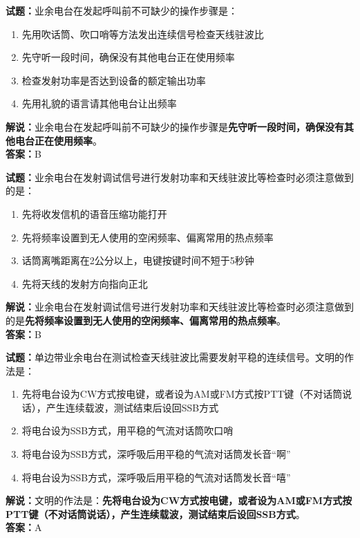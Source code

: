 \documentclass{ctexbook}
\begin{document}
\vspace{1em}

\textbf{试题：}业余电台在发起呼叫前不可缺少的操作步骤是：
\begin{enumerate}[leftmargin=3em]
  \item 先用吹话筒、吹口哨等方法发出连续信号检查天线驻波比
  \item 先守听一段时间，确保没有其他电台正在使用频率
  \item 检查发射功率是否达到设备的额定输出功率
  \item 先用礼貌的语言请其他电台让出频率
\end{enumerate}
\noindent\textbf{解说：}业余电台在发起呼叫前不可缺少的操作步骤是\textbf{先守听一段时间，确保没有其他电台正在使用频率}。\\\noindent\textbf{答案：}B

\vspace{1em}

\textbf{试题：}业余电台在发射调试信号进行发射功率和天线驻波比等检查时必须注意做到的是：
\begin{enumerate}[leftmargin=3em]
  \item 先将收发信机的语音压缩功能打开
  \item 先将频率设置到无人使用的空闲频率、偏离常用的热点频率
  \item 话筒离嘴距离在2公分以上，电键按键时间不短于5秒钟
  \item 先将天线的发射方向指向正北
\end{enumerate}
\noindent\textbf{解说：}业余电台在发射调试信号进行发射功率和天线驻波比等检查时必须注意做到的是\textbf{先将频率设置到无人使用的空闲频率、偏离常用的热点频率}。\\\noindent\textbf{答案：}B

\vspace{1em}

\textbf{试题：}单边带业余电台在测试检查天线驻波比需要发射平稳的连续信号。文明的作法是：
\begin{enumerate}[leftmargin=3em]
  \item 先将电台设为CW方式按电键，或者设为AM或FM方式按PTT键（不对话筒说话），产生连续载波，测试结束后设回SSB方式
  \item 将电台设为SSB方式，用平稳的气流对话筒吹口哨
  \item 将电台设为SSB方式，深呼吸后用平稳的气流对话筒发长音“啊”
  \item 将电台设为SSB方式，深呼吸后用平稳的气流对话筒发长音“嘻”
\end{enumerate}
\noindent\textbf{解说：}文明的作法是：\textbf{先将电台设为CW方式按电键，或者设为AM或FM方式按PTT键（不对话筒说话），产生连续载波，测试结束后设回SSB方式}。\\\noindent\textbf{答案：}A
\end{document}
